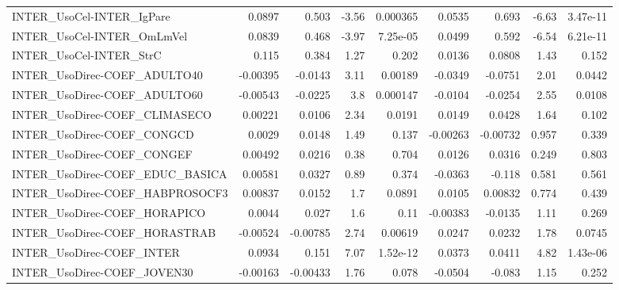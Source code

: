 \begin{tabular}{lrrrrrrrr}
INTER\_UsoCel-INTER\_IgPare              &      0.0897 &        0.503 &    -3.56 & 0.000365 &     0.0535 &       0.693 &        -6.63 &      3.47e-11 \\
INTER\_UsoCel-INTER\_OmLmVel             &      0.0839 &        0.468 &    -3.97 & 7.25e-05 &     0.0499 &       0.592 &        -6.54 &      6.21e-11 \\
INTER\_UsoCel-INTER\_StrC                &       0.115 &        0.384 &     1.27 &    0.202 &     0.0136 &      0.0808 &         1.43 &         0.152 \\
INTER\_UsoDirec-COEF\_ADULTO40           &    -0.00395 &      -0.0143 &     3.11 &  0.00189 &    -0.0349 &     -0.0751 &         2.01 &        0.0442 \\
INTER\_UsoDirec-COEF\_ADULTO60           &    -0.00543 &      -0.0225 &      3.8 & 0.000147 &    -0.0104 &     -0.0254 &         2.55 &        0.0108 \\
INTER\_UsoDirec-COEF\_CLIMASECO          &     0.00221 &       0.0106 &     2.34 &   0.0191 &     0.0149 &      0.0428 &         1.64 &         0.102 \\
INTER\_UsoDirec-COEF\_CONGCD             &      0.0029 &       0.0148 &     1.49 &    0.137 &   -0.00263 &    -0.00732 &        0.957 &         0.339 \\
INTER\_UsoDirec-COEF\_CONGEF             &     0.00492 &       0.0216 &     0.38 &    0.704 &     0.0126 &      0.0316 &        0.249 &         0.803 \\
INTER\_UsoDirec-COEF\_EDUC\_BASICA        &     0.00581 &       0.0327 &     0.89 &    0.374 &    -0.0363 &      -0.118 &        0.581 &         0.561 \\
INTER\_UsoDirec-COEF\_HABPROSOCF3        &     0.00837 &       0.0152 &      1.7 &   0.0891 &     0.0105 &     0.00832 &        0.774 &         0.439 \\
INTER\_UsoDirec-COEF\_HORAPICO           &      0.0044 &        0.027 &      1.6 &     0.11 &   -0.00383 &     -0.0135 &         1.11 &         0.269 \\
INTER\_UsoDirec-COEF\_HORASTRAB          &    -0.00524 &     -0.00785 &     2.74 &  0.00619 &     0.0247 &      0.0232 &         1.78 &        0.0745 \\
INTER\_UsoDirec-COEF\_INTER              &      0.0934 &        0.151 &     7.07 & 1.52e-12 &     0.0373 &      0.0411 &         4.82 &      1.43e-06 \\
INTER\_UsoDirec-COEF\_JOVEN30            &    -0.00163 &     -0.00433 &     1.76 &    0.078 &    -0.0504 &      -0.083 &         1.15 &         0.252 \\

\end{tabular}
